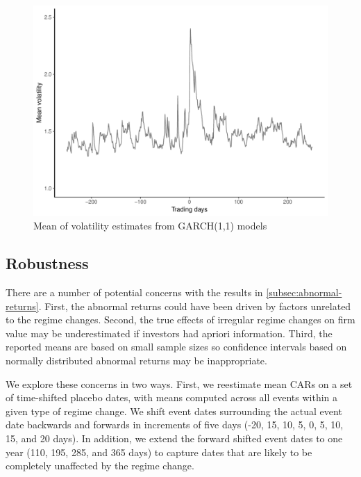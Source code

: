 \documentclass[12pt,final,fleqn]{article}
\theoremstyle{plain}
\begin{document}
\begin{figure}[htb]
\includegraphics{../figs/mean-volatility.pdf}
\caption{Mean of volatility estimates from GARCH(1,1) models}
\label{fig:volatility}
\end{figure}

\subsection{Robustness} \label{subsec: Robustness}
There are a number of potential concerns with the results in \autoref{subsec:abnormal-returns}. First, the abnormal returns could have been driven by factors unrelated to the regime changes.  Second, the true effects of irregular regime changes on firm value may be underestimated if investors had apriori information. Third, the reported means are based on small sample sizes so confidence intervals based on normally distributed abnormal returns may be inappropriate.

We explore these concerns in two ways. First, we reestimate mean CARs on a set of time-shifted placebo dates, with means computed across all events within a given type of regime change. We shift event dates surrounding the actual event date backwards and forwards in increments of five days (-20, 15, 10, 5, 0, 5, 10, 15, and 20 days). In addition, we extend the forward shifted event dates to one year (110, 195, 285, and 365 days) to capture dates that are likely to be completely unaffected by the regime change. 
\end{document}
